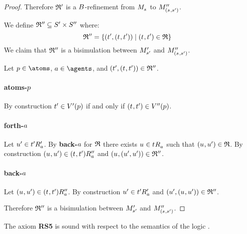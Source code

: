 \begin{proof}
Therefore $\mathfrak{R}'$ is a $B$-refinement from $\kPModel{\kStateS}$ to $\kPModelPP{(\kStateS, \kStateSP)}$.

We define $\mathfrak{R}'' \subseteq {S^{\prime}} \times {S^{\prime\prime}}$ where:
$$
\bisimulation'' = \{(\kStateTP, (\kStateT, \kStateTP)) \mid (\kStateT, \kStateTP) \in \refinement\}
$$
We claim that $\mathfrak{R}''$ is a bisimulation between ${M^{\prime}_{{s}^{\prime}}}$ and $\kPModelPP{(\kStateS, \kStateSP)}$.

Let $\atomP \in \atoms$, $\agentA \in \agents$, and $(\kStateTP, (\kStateT, \kStateTP)) \in \bisimulation''$.

\paragraph{atoms-$p$}
By construction ${t}^{\prime} \in {V^{\prime}}(p)$ if and only if $(\kStateT, \kStateTP) \in \kValuationPP(\atomP)$.

\paragraph{forth-$a$}
Let ${u}^{\prime} \in {{t}^{\prime}} {R^{\prime}_{a}}$.
By {\bf back-$a$} for $\mathfrak{R}$ there exists $\kStateU \in \kSuccessorsA{\kStateT}$ such that $(\kStateU, \kStateUP) \in \refinement$.
By construction $(\kStateU, \kStateUP) \in \kSuccessorsPPA{(\kStateT, \kStateTP)}$ and $(\kStateU, (\kStateUP, \kStateUP)) \in \bisimulation''$.

\paragraph{back-$a$}
Let $(\kStateU, \kStateUP) \in \kSuccessorsPPA{(\kStateT, \kStateTP)}$.
By construction ${u}^{\prime} \in {{t}^{\prime}} {R^{\prime}_{a}}$ and $(\kStateUP, (\kStateU, \kStateUP)) \in \bisimulation''$.

Therefore $\mathfrak{R}''$ is a bisimulation between ${M^{\prime}_{{s}^{\prime}}}$ and $\kPModelPP{(\kStateS, \kStateSP)}$.
\end{proof}

\begin{lemma}\label{rml-s5-rs5}
The axiom {\bf RS5} is sound with respect to the semantics of the logic \logicRmlS{}.
\end{lemma}

